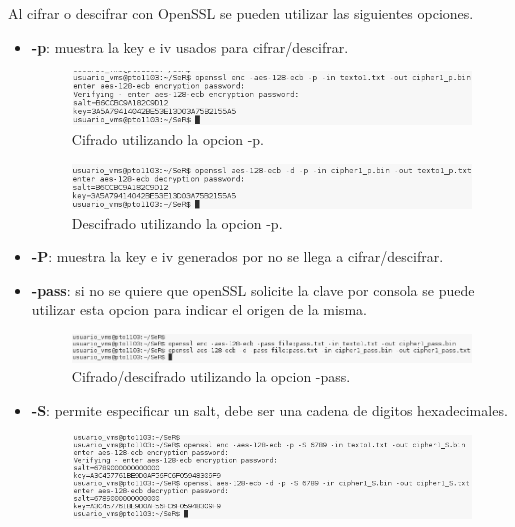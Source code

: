 \documentclass[11pt]{article}
\begin{document}
      \par
      Al cifrar o descifrar con OpenSSL se pueden utilizar las siguientes opciones.
      \begin{itemize}
        \item \textbf{-p}: muestra la key e iv usados para cifrar/descifrar.
              \begin{figure}[!ht]
                \centering
                \includegraphics[width = .9\textwidth]{cipher_p}
                \caption{Cifrado utilizando la opcion -p.}
              \end{figure}
              \begin{figure}[!ht]
                \centering
                \includegraphics[width = .9\textwidth]{dcipher_p}
                \caption{Descifrado utilizando la opcion -p.}
              \end{figure}
        \item \textbf{-P}: muestra la key e iv generados por no se llega a cifrar/descifrar.
        \item \textbf{-pass}: si no se quiere que openSSL solicite la clave por consola se puede utilizar esta opcion para indicar el origen de la misma.
              \begin{figure}[!ht]
                \centering
                \includegraphics[width = .9\textwidth]{cipher_pass}
                \caption{Cifrado/descifrado utilizando la opcion -pass.}
              \end{figure}
        \item \textbf{-S}: permite especificar un salt, debe ser una cadena de digitos hexadecimales.
              \begin{figure}[!ht]
                \centering
                \includegraphics[width = .9\textwidth]{cipher_S}

\end{figure}
\end{itemize}
\end{document}
